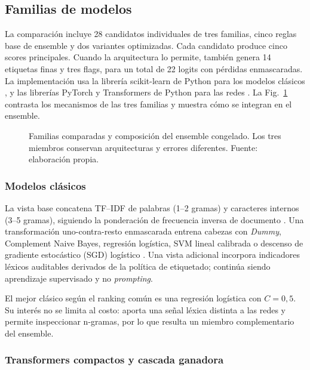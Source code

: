 \subsection{Familias de modelos}

La comparación incluye 28 candidatos individuales de tres familias, cinco reglas base de ensemble y dos variantes optimizadas. Cada candidato produce cinco scores principales. Cuando la arquitectura lo permite, también genera 14 etiquetas finas y tres flags, para un total de 22 logits con pérdidas enmascaradas. La implementación usa la librería scikit-learn de Python para los modelos clásicos \cite{pedregosa2011sklearn}, y las librerías PyTorch y Transformers de Python para las redes \cite{paszke2019pytorch,wolf2020transformers}. La Fig.~\ref{fig:modelos} contrasta los mecanismos de las tres familias y muestra cómo se integran en el ensemble.

\begin{figure}[t]
\centering
\resizebox{.98\textwidth}{!}{}
\caption{Familias comparadas y composición del ensemble congelado. Los tres miembros conservan arquitecturas y errores diferentes. Fuente: elaboración propia.}
\label{fig:modelos}
\end{figure}

\subsubsection{Modelos clásicos}

La vista base concatena TF--IDF de palabras (1--2 gramas) y caracteres internos (3--5 gramas), siguiendo la ponderación de frecuencia inversa de documento \cite{sparckjones1972idf}. Una transformación uno-contra-resto enmascarada entrena cabezas con \emph{Dummy}, Complement Naive Bayes, regresión logística, SVM lineal calibrada o descenso de gradiente estocástico (SGD) logístico \cite{cox1958logistic,cortes1995svm,rennie2003cnb}. Una vista adicional incorpora indicadores léxicos auditables derivados de la política de etiquetado; continúa siendo aprendizaje supervisado y no \emph{prompting}.

El mejor clásico según el ranking común es una regresión logística con $C=0,5$. Su interés no se limita al costo: aporta una señal léxica distinta a las redes y permite inspeccionar n-gramas, por lo que resulta un miembro complementario del ensemble.

\subsubsection{Transformers compactos y cascada ganadora}

